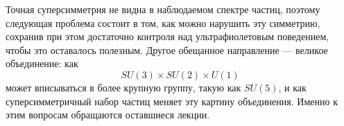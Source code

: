 Точная суперсимметрия не видна в наблюдаемом спектре частиц, поэтому следующая проблема состоит в том, как можно нарушить эту симметрию, сохранив при этом достаточно контроля над ультрафиолетовым поведением, чтобы это оставалось полезным. Другое обещанное направление — великое объединение: как
\begin{equation}
SU(3)\times SU(2)\times U(1)
\end{equation}
может вписываться в более крупную группу, такую как \(SU(5)\), и как суперсимметричный набор частиц меняет эту картину объединения. Именно к этим вопросам обращаются оставшиеся лекции.

